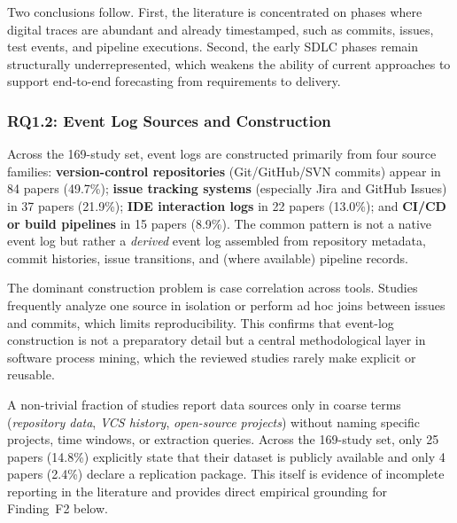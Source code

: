 Two conclusions follow. First, the literature is concentrated on phases where
digital traces are abundant and already timestamped, such as commits, issues,
test events, and pipeline executions. Second, the early SDLC phases remain
structurally underrepresented, which weakens the ability of current
approaches to support end-to-end forecasting from requirements to delivery.

\subsubsection{RQ1.2: Event Log Sources and Construction}

Across the 169-study set, event logs are constructed primarily from four
source families: \textbf{version-control repositories} (Git/GitHub/SVN
commits) appear in 84 papers (49.7\%); \textbf{issue tracking systems}
(especially Jira and GitHub Issues) in 37 papers (21.9\%); \textbf{IDE
interaction logs} in 22 papers (13.0\%); and \textbf{CI/CD or build
pipelines} in 15 papers (8.9\%). The common pattern is not a native event
log but rather a \emph{derived} event log assembled from repository metadata,
commit histories, issue transitions, and (where available) pipeline records.

The dominant construction problem is case correlation across tools. Studies
frequently analyze one source in isolation or perform ad hoc joins between
issues and commits, which limits reproducibility. This confirms that event-log
construction is not a preparatory detail but a central methodological layer in
software process mining, which the reviewed studies rarely make explicit or
reusable.

A non-trivial fraction of studies report data sources only in coarse terms
(\textit{repository data}, \textit{VCS history}, \textit{open-source
projects}) without naming specific projects, time windows, or extraction
queries. Across the 169-study set, only 25 papers (14.8\%) explicitly state
that their dataset is publicly available and only 4 papers (2.4\%) declare a
replication package. This itself is evidence of incomplete reporting in the
literature and provides direct empirical grounding for Finding~F2 below.

